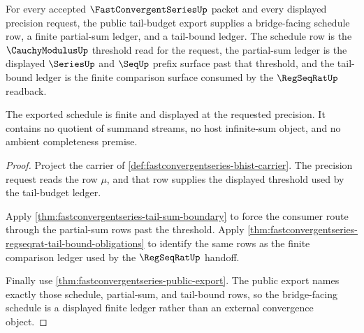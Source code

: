 \begin{theorem}
\label{thm:fastconvergentseries-bridge-tail-budget-schedule}
For every accepted $\FastConvergentSeriesUp$ packet and every displayed precision request, the public tail-budget export supplies a bridge-facing schedule row, a finite partial-sum ledger, and a tail-bound ledger. The schedule row is the $\CauchyModulusUp$ threshold read for the request, the partial-sum ledger is the displayed $\SeriesUp$ and $\SeqUp$ prefix surface past that threshold, and the tail-bound ledger is the finite comparison surface consumed by the $\RegSeqRatUp$ readback.

The exported schedule is finite and displayed at the requested precision. It contains no quotient of summand streams, no host infinite-sum object, and no ambient completeness premise.
\end{theorem}
\begin{proof}
Project the carrier of \autoref{def:fastconvergentseries-bhist-carrier}. The precision request reads the row $\mu$, and that row supplies the displayed threshold used by the tail-budget ledger.

Apply \autoref{thm:fastconvergentseries-tail-sum-boundary} to force the consumer route through the partial-sum rows past the threshold. Apply \autoref{thm:fastconvergentseries-regseqrat-tail-bound-obligations} to identify the same rows as the finite comparison ledger used by the $\RegSeqRatUp$ handoff.

Finally use \autoref{thm:fastconvergentseries-public-export}. The public export names exactly those schedule, partial-sum, and tail-bound rows, so the bridge-facing schedule is a displayed finite ledger rather than an external convergence object.
\end{proof}

